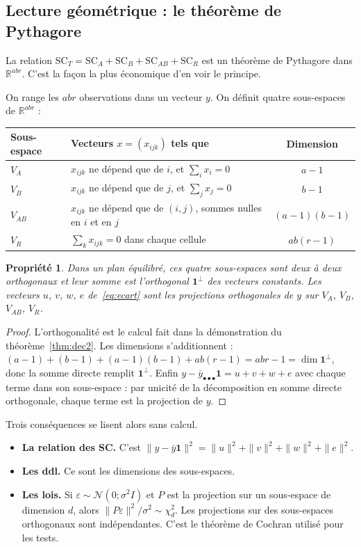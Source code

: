 \documentclass[11pt,a4paper]{article}
\theoremstyle{sj}
\newtheorem{prop}[thm]{Propriété}
\theoremstyle{definition}
\theoremstyle{remark}
\newcommand{\N}{\mathcal{N}}
\newcommand{\SC}{\mathrm{SC}}
\newcommand{\ybar}{\bar y}
\newcommand{\dotp}{{\scriptscriptstyle\bullet}}
\begin{document}
\subsection{Lecture géométrique : le théorème de Pythagore}\label{sec:geo}

La relation $\SC_T=\SC_A+\SC_B+\SC_{AB}+\SC_R$ est un théorème de Pythagore dans $\mathbb R^{abr}$. C'est la façon la plus économique d'en voir le principe.

On range les $abr$ observations dans un vecteur $y$. On définit quatre sous-espaces de $\mathbb R^{abr}$ :
\begin{center}
\begin{tabular}{l l c}
\toprule
Sous-espace & Vecteurs $x=(x_{ijk})$ tels que & Dimension\\
\midrule
$V_A$ & $x_{ijk}$ ne dépend que de $i$, et $\sum_i x_{i}=0$ & $a-1$\\
$V_B$ & $x_{ijk}$ ne dépend que de $j$, et $\sum_j x_{j}=0$ & $b-1$\\
$V_{AB}$ & $x_{ijk}$ ne dépend que de $(i,j)$, sommes nulles en $i$ et en $j$ & $(a-1)(b-1)$\\
$V_R$ & $\sum_k x_{ijk}=0$ dans chaque cellule & $ab(r-1)$\\
\bottomrule
\end{tabular}
\end{center}

\begin{prop}
Dans un plan équilibré, ces quatre sous-espaces sont deux à deux orthogonaux et leur somme est l'orthogonal $\mathbf 1^\perp$ des vecteurs constants. Les vecteurs $u$, $v$, $w$, $e$ de~\eqref{eq:ecart} sont les projections orthogonales de $y$ sur $V_A$, $V_B$, $V_{AB}$, $V_R$.
\end{prop}

\begin{proof}
L'orthogonalité est le calcul fait dans la démonstration du théorème~\ref{thm:dec2}. Les dimensions s'additionnent : $(a-1)+(b-1)+(a-1)(b-1)+ab(r-1)=abr-1=\dim\mathbf 1^\perp$, donc la somme directe remplit $\mathbf 1^\perp$. Enfin $y-\ybar_{\dotp\dotp\dotp}\mathbf 1=u+v+w+e$ avec chaque terme dans son sous-espace : par unicité de la décomposition en somme directe orthogonale, chaque terme est la projection de $y$.
\end{proof}

Trois conséquences se lisent alors sans calcul.
\begin{itemize}[leftmargin=1.4em]
\item \textbf{La relation des SC.} C'est $\|y-\ybar\mathbf 1\|^2=\|u\|^2+\|v\|^2+\|w\|^2+\|e\|^2$.
\item \textbf{Les ddl.} Ce sont les dimensions des sous-espaces.
\item \textbf{Les lois.} Si $\varepsilon\sim\N(0;\sigma^2 I)$ et $P$ est la projection sur un sous-espace de dimension $d$, alors $\|P\varepsilon\|^2/\sigma^2\sim\chi^2_d$. Les projections sur des sous-espaces orthogonaux sont indépendantes. C'est le théorème de Cochran utilisé pour les tests.
\end{itemize}
\end{document}
